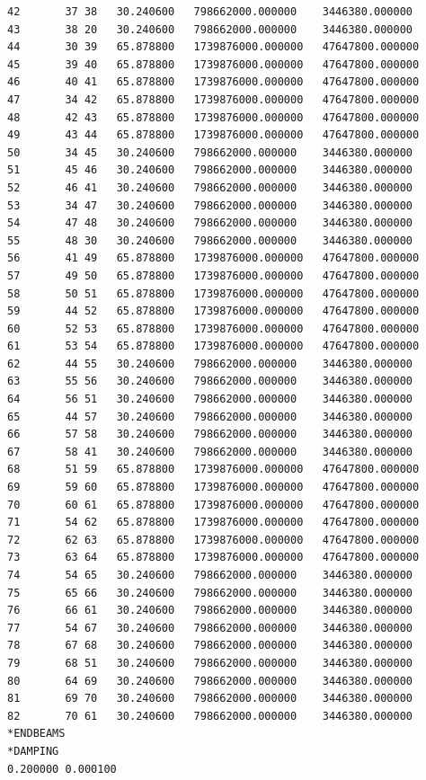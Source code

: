 \documentclass[10pt,a4paper,final]{report}
\begin{document}
\begin{lstlisting}
42 	 	 37 38 	 30.240600 	 798662000.000000 	 3446380.000000
43 	 	 38 20 	 30.240600 	 798662000.000000 	 3446380.000000
44 	 	 30 39 	 65.878800 	 1739876000.000000 	 47647800.000000
45 	 	 39 40 	 65.878800 	 1739876000.000000 	 47647800.000000
46 	 	 40 41 	 65.878800 	 1739876000.000000 	 47647800.000000
47 	 	 34 42 	 65.878800 	 1739876000.000000 	 47647800.000000
48 	 	 42 43 	 65.878800 	 1739876000.000000 	 47647800.000000
49 	 	 43 44 	 65.878800 	 1739876000.000000 	 47647800.000000
50 	 	 34 45 	 30.240600 	 798662000.000000 	 3446380.000000
51 	 	 45 46 	 30.240600 	 798662000.000000 	 3446380.000000
52 	 	 46 41 	 30.240600 	 798662000.000000 	 3446380.000000
53 	 	 34 47 	 30.240600 	 798662000.000000 	 3446380.000000
54 	 	 47 48 	 30.240600 	 798662000.000000 	 3446380.000000
55 	 	 48 30 	 30.240600 	 798662000.000000 	 3446380.000000
56 	 	 41 49 	 65.878800 	 1739876000.000000 	 47647800.000000
57 	 	 49 50 	 65.878800 	 1739876000.000000 	 47647800.000000
58 	 	 50 51 	 65.878800 	 1739876000.000000 	 47647800.000000
59 	 	 44 52 	 65.878800 	 1739876000.000000 	 47647800.000000
60 	 	 52 53 	 65.878800 	 1739876000.000000 	 47647800.000000
61 	 	 53 54 	 65.878800 	 1739876000.000000 	 47647800.000000
62 	 	 44 55 	 30.240600 	 798662000.000000 	 3446380.000000
63 	 	 55 56 	 30.240600 	 798662000.000000 	 3446380.000000
64 	 	 56 51 	 30.240600 	 798662000.000000 	 3446380.000000
65 	 	 44 57 	 30.240600 	 798662000.000000 	 3446380.000000
66 	 	 57 58 	 30.240600 	 798662000.000000 	 3446380.000000
67 	 	 58 41 	 30.240600 	 798662000.000000 	 3446380.000000
68 	 	 51 59 	 65.878800 	 1739876000.000000 	 47647800.000000
69 	 	 59 60 	 65.878800 	 1739876000.000000 	 47647800.000000
70 	 	 60 61 	 65.878800 	 1739876000.000000 	 47647800.000000
71 	 	 54 62 	 65.878800 	 1739876000.000000 	 47647800.000000
72 	 	 62 63 	 65.878800 	 1739876000.000000 	 47647800.000000
73 	 	 63 64 	 65.878800 	 1739876000.000000 	 47647800.000000
74 	 	 54 65 	 30.240600 	 798662000.000000 	 3446380.000000
75 	 	 65 66 	 30.240600 	 798662000.000000 	 3446380.000000
76 	 	 66 61 	 30.240600 	 798662000.000000 	 3446380.000000
77 	 	 54 67 	 30.240600 	 798662000.000000 	 3446380.000000
78 	 	 67 68 	 30.240600 	 798662000.000000 	 3446380.000000
79 	 	 68 51 	 30.240600 	 798662000.000000 	 3446380.000000
80 	 	 64 69 	 30.240600 	 798662000.000000 	 3446380.000000
81 	 	 69 70 	 30.240600 	 798662000.000000 	 3446380.000000
82 	 	 70 61 	 30.240600 	 798662000.000000 	 3446380.000000
*ENDBEAMS
*DAMPING
0.200000 0.000100
\end{lstlisting}
\end{document}
